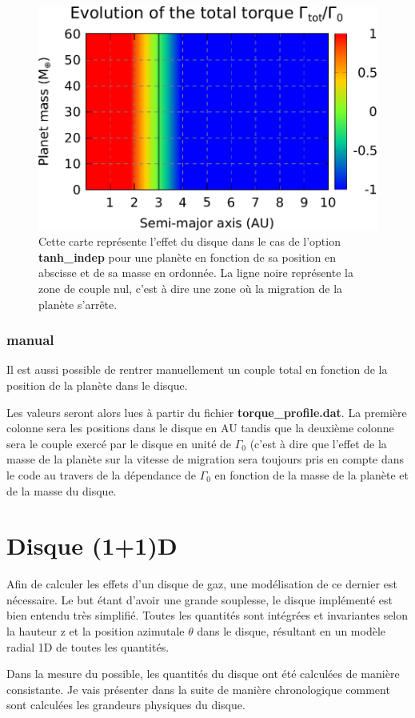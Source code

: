 \begin{figure}[htb]
\centering
\includegraphics[width=0.65\linewidth]{figure/migration_map/tanh_indep.pdf}
\caption{Cette carte représente l'effet du disque dans le cas de l'option \textbf{tanh\_indep} pour une planète en fonction de sa position en abscisse et de sa masse en ordonnée. La ligne noire représente la zone de couple nul, c'est à dire une zone où la migration de la planète s'arrête.}
\end{figure}

\subsubsection{manual}
Il est aussi possible de rentrer manuellement un couple total en fonction de la position de la planète dans le disque. 

Les valeurs seront alors lues à partir du fichier \textbf{torque\_profile.dat}. La première colonne sera les positions dans le disque en AU tandis que la deuxième colonne sera le couple exercé par le disque en unité de $\Gamma_0$ (c'est à dire que l'effet de la masse de la planète sur la vitesse de migration sera toujours pris en compte dans le code au travers de la dépendance de $\Gamma_0$ en fonction de la masse de la planète et de la masse du disque.

\section{Disque (1+1)D}
Afin de calculer les effets d'un disque de gaz, une modélisation de ce dernier est nécessaire. Le but étant d'avoir une grande souplesse, le disque implémenté est bien entendu très simplifié. Toutes les quantités sont intégrées et invariantes selon la hauteur z et la position azimutale $\theta$ dans le disque, résultant en un modèle radial 1D de toutes les quantités. 

Dans la mesure du possible, les quantités du disque ont été calculées de manière consistante. Je vais présenter dans la suite de manière chronologique comment sont calculées les grandeurs physiques du disque.

